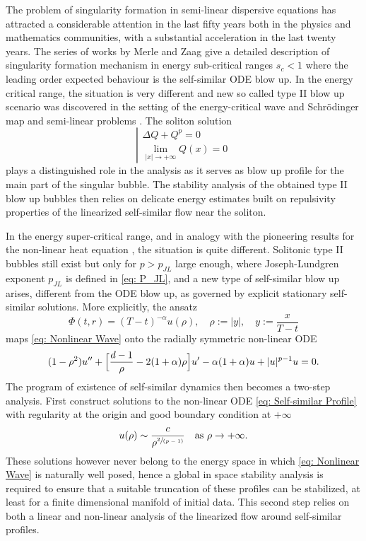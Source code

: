 \documentclass[10pt]{amsart}
\newcommand{\spfrac}[2]{\sfrac{#1}{(#2)}}
\theoremstyle{plain}
\theoremstyle{definition}
\begin{document}
The problem of singularity formation in semi-linear dispersive equations has attracted a considerable attention in the last fifty years both in the physics and mathematics communities, with a substantial acceleration in the last twenty years. The series of works by Merle and Zaag \cite{MZ1,MZ2, MZ3, MZ4} give a detailed description of singularity formation mechanism in energy sub-critical ranges $s_c<1$ where the leading order expected behaviour is the self-similar ODE blow up. In the energy critical range, the situation is very different and new so called type II blow up scenario was discovered in the setting of the energy-critical wave and Schrödinger map \cite{KST, RodSter, RaphRod, MRRsch} and semi-linear problems \cite{HR}. The soliton solution
\[
\left|\begin{array}{l}
\Delta Q+Q^p=0\\
\lim_{|x|\to +\infty} Q(x)=0
\end{array}\right.
\]
plays a distinguished role in the analysis as it serves as blow up profile for the main part of the singular bubble. The stability analysis of the obtained type II blow up bubbles then relies on delicate energy estimates built on repulsivity properties of the linearized self-similar flow near the soliton.

In the energy super-critical range, and in analogy with the pioneering results for the non-linear heat equation \cite{HV, MaMe1, MaMe2,CMRcylind}, the situation is quite different. Solitonic type II bubbles still exist but only for $p>p_{JL}$ large enough, \cite{MRRnls, C} where Joseph-Lundgren exponent $p_{JL}$ is defined in \eqref{eq: P_JL}, and a new type of self-similar blow up arises, different from the ODE blow up, as governed by explicit stationary self-similar solutions. More explicitly, the ansatz
\begin{equation}
\label{eq: Ansatz}
\Phi(t,r)=(T-t)^{-\alpha}u(\rho),\quad \rho:=|y|,\quad y:=\frac{x}{T-t}
\end{equation}
maps \eqref{eq: Nonlinear Wave} onto the radially symmetric non-linear ODE
\begin{equation}
\label{eq: Self-similar Profile}
(1-\rho^2)u''+\Bigl[\frac{d-1}{\rho}-2(1+\alpha)\rho\Bigr]u'-\alpha(1+\alpha)u+|u|^{p-1}u=0.
\end{equation}
The program of existence of self-similar dynamics then becomes a two-step analysis. First construct solutions to the non-linear ODE \eqref{eq: Self-similar Profile} with regularity at the origin and good boundary condition at $+\infty$
\[
u(\rho)\sim \frac{c}{\rho^{\spfrac 2{p-1}}}\quad \mbox{as} \ \rho\to+\infty.
\]
These solutions however never belong to the energy space in which \eqref{eq: Nonlinear Wave} is naturally well posed, hence a global in space stability analysis is required to ensure that a suitable truncation of these profiles can be stabilized, at least for a finite dimensional manifold of initial data. This second step relies on both a linear and non-linear analysis of the linearized flow around self-similar profiles.
\end{document}
